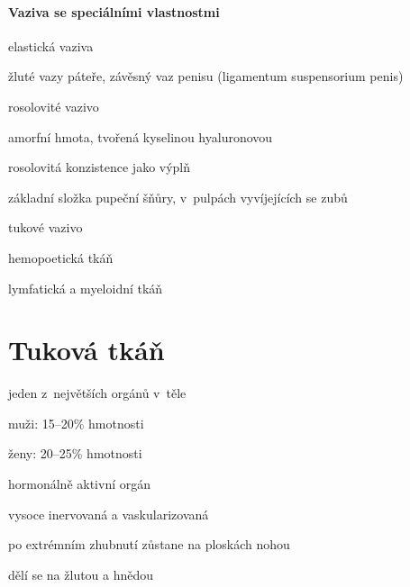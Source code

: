 \documentclass[DIV=8]{scrreprt}
\begin{document}
\paragraph{Vaziva se speciálními vlastnostmi}
\begin{myItemize}[nosep]
    \item elastická vaziva
\begin{myItemize}[nosep]
    \item žluté vazy páteře, závěsný vaz penisu (ligamentum suspensorium penis)
\end{myItemize}

    \item rosolovité vazivo
\begin{myItemize}[nosep]
    \item amorfní hmota, tvořená kyselinou hyaluronovou
    \item rosolovitá konzistence jako výplň
    \item základní složka pupeční šňůry, v pulpách vyvíjejících se zubů
\end{myItemize}

    \item tukové vazivo
    \item hemopoetická tkáň
\begin{myItemize}[nosep]
    \item lymfatická a myeloidní tkáň
\end{myItemize}

\end{myItemize}



\section{Tuková tkáň} \label{Tuková tkáň} \FloatBarrier


\begin{myItemize}[nosep]
    \item jeden z největších orgánů v těle
\begin{myItemize}[nosep]
    \item muži: 15--20\% hmotnosti
    \item ženy: 20--25\% hmotnosti
\end{myItemize}

    \item hormonálně aktivní orgán
    \item vysoce inervovaná a vaskularizovaná
    \item po extrémním zhubnutí zůstane na ploskách nohou
    \item dělí se na žlutou a hnědou
\end{myItemize}
\end{document}
